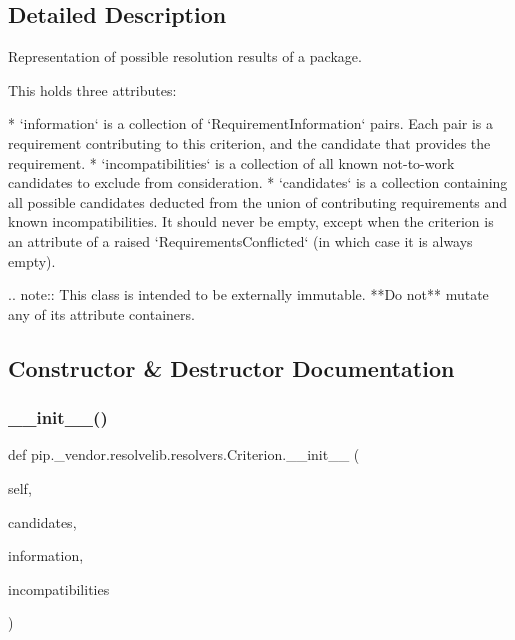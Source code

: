 \subsection{Detailed Description}
\begin{DoxyVerb}Representation of possible resolution results of a package.

This holds three attributes:

* `information` is a collection of `RequirementInformation` pairs.
  Each pair is a requirement contributing to this criterion, and the
  candidate that provides the requirement.
* `incompatibilities` is a collection of all known not-to-work candidates
  to exclude from consideration.
* `candidates` is a collection containing all possible candidates deducted
  from the union of contributing requirements and known incompatibilities.
  It should never be empty, except when the criterion is an attribute of a
  raised `RequirementsConflicted` (in which case it is always empty).

.. note::
    This class is intended to be externally immutable. **Do not** mutate
    any of its attribute containers.
\end{DoxyVerb}
 

\subsection{Constructor \& Destructor Documentation}
\mbox{\label{classpip_1_1__vendor_1_1resolvelib_1_1resolvers_1_1Criterion_ae24643d51c3ff79684252f228b4a2d35}} 
\subsubsection{\texorpdfstring{\+\_\+\+\_\+init\+\_\+\+\_\+()}{\_\_init\_\_()}}
{\footnotesize\ttfamily def pip.\+\_\+vendor.\+resolvelib.\+resolvers.\+Criterion.\+\_\+\+\_\+init\+\_\+\+\_\+ (\begin{DoxyParamCaption}\item[{}]{self,  }\item[{}]{candidates,  }\item[{}]{information,  }\item[{}]{incompatibilities }\end{DoxyParamCaption})}



